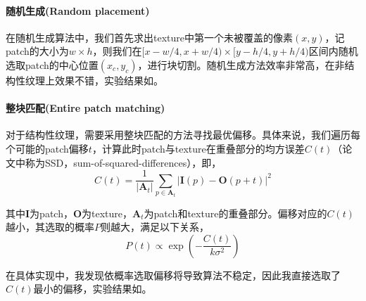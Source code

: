 \documentclass[11pt,a4paper]{article}
\begin{document}
\paragraph{随机生成(Random placement)} 在随机生成算法中，我们首先求出texture中第一个未被覆盖的像素$(x,y)$，记patch的大小为$w\times h$，则我们在$[x-w/4,x+w/4) \times [y-h/4,y+h/4)$区间内随机选取patch的中心位置$(x_c,y_c)$，进行块切割。随机生成方法效率非常高，在非结构性纹理上效果不错，实验结果如。

\paragraph{整块匹配(Entire patch matching)} 对于结构性纹理，需要采用整块匹配的方法寻找最优偏移。具体来说，我们遍历每个可能的patch偏移$t$，计算此时patch与texture在重叠部分的均方误差$C(t)$（论文中称为SSD，sum-of-squared-differences），即，
\begin{equation}\label{eq:entire_patch}
    C(t) = \frac{1}{|\mathbf{A}_t|}\sum_{p\in\mathbf{A}_t}|\mathbf{I}(p)-\mathbf{O}(p+t)|^2
\end{equation}

其中$\mathbf{I}$为patch，$\mathbf{O}$为texture，$\mathbf{A}_t$为patch和texture的重叠部分。偏移对应的$C(t)$越小，其选取的概率$P$则越大，满足以下关系，
\begin{equation}
    P(t) \propto \exp\left(-\frac{C(t)}{k\sigma^2}\right)
\end{equation}

在具体实现中，我发现依概率选取偏移将导致算法不稳定，因此我直接选取了$C(t)$最小的偏移，实验结果如。
\end{document}
